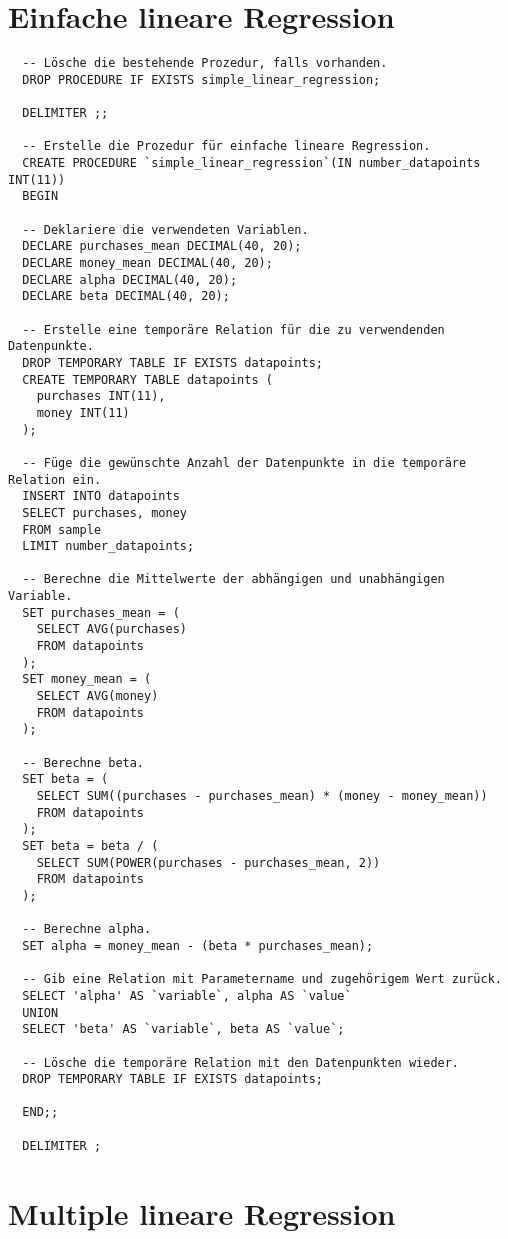 \section{Einfache lineare Regression}
\label{appendix:D:1}

\begin{verbatim}
  -- Lösche die bestehende Prozedur, falls vorhanden.
  DROP PROCEDURE IF EXISTS simple_linear_regression;

  DELIMITER ;;

  -- Erstelle die Prozedur für einfache lineare Regression.
  CREATE PROCEDURE `simple_linear_regression`(IN number_datapoints INT(11))
  BEGIN

  -- Deklariere die verwendeten Variablen.
  DECLARE purchases_mean DECIMAL(40, 20);
  DECLARE money_mean DECIMAL(40, 20);
  DECLARE alpha DECIMAL(40, 20);
  DECLARE beta DECIMAL(40, 20);

  -- Erstelle eine temporäre Relation für die zu verwendenden Datenpunkte.
  DROP TEMPORARY TABLE IF EXISTS datapoints;
  CREATE TEMPORARY TABLE datapoints (
    purchases INT(11),
    money INT(11)
  );

  -- Füge die gewünschte Anzahl der Datenpunkte in die temporäre Relation ein.
  INSERT INTO datapoints
  SELECT purchases, money
  FROM sample
  LIMIT number_datapoints;

  -- Berechne die Mittelwerte der abhängigen und unabhängigen Variable.
  SET purchases_mean = (
    SELECT AVG(purchases)
    FROM datapoints
  );
  SET money_mean = (
    SELECT AVG(money)
    FROM datapoints
  );

  -- Berechne beta.
  SET beta = (
    SELECT SUM((purchases - purchases_mean) * (money - money_mean))
    FROM datapoints
  );
  SET beta = beta / (
    SELECT SUM(POWER(purchases - purchases_mean, 2))
    FROM datapoints
  );

  -- Berechne alpha.
  SET alpha = money_mean - (beta * purchases_mean);

  -- Gib eine Relation mit Parametername und zugehörigem Wert zurück.
  SELECT 'alpha' AS `variable`, alpha AS `value`
  UNION
  SELECT 'beta' AS `variable`, beta AS `value`;

  -- Lösche die temporäre Relation mit den Datenpunkten wieder.
  DROP TEMPORARY TABLE IF EXISTS datapoints;

  END;;

  DELIMITER ;
\end{verbatim}

\section{Multiple lineare Regression}
\label{appendix:D:2}

